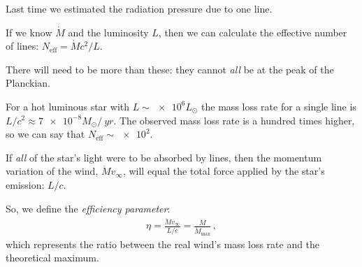 \documentclass[main.tex]{subfiles}
\begin{document}

Last time we estimated the radiation pressure due to one line.

If we know \(\dot{M} \) and the luminosity \(L\), then we can calculate the effective number of  lines: \(N _{\text{eff}} = \dot{M} c^2 / L\).

\begin{bluebox}
There will need to be more than these: they cannot \emph{all} be at the peak of the Planckian. 
\end{bluebox}

For a hot luminous star with \(L \sim \num{e6} L_{\odot}\) the mass loss rate for a single line is \(L/c^2 \approx \num{7e-8} M_{\odot} / \SI{}{yr}\).
The observed mass loss rate is a hundred times higher, so we can say that \(N  _{\text{eff}} \sim \num{e2}\).

If \emph{all} of the star's light were to be absorbed by lines, then the momentum variation of the wind, \(\dot{M} v_{ \infty }\), will equal the total force applied by the star's emission: \(L/c\). 


So, we define the \emph{efficiency parameter}: 
%
\begin{align}
  \eta = \frac{\dot{M} v_{\infty}}{L / c} = \frac{\dot{M}}{\dot{M} _{\text{max}}}
\,,
\end{align}
%
which represents the ratio between the real wind's mass loss rate and the theoretical maximum.
\end{document}
